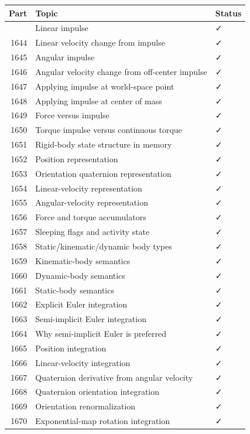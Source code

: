 {\def\LTcaptype{none} %
\begin{longtable}[]{@{}rll@{}}
\toprule\noalign{}
Part & Topic & Status \\
\midrule\noalign{}
\endhead
\bottomrule\noalign{}
\endlastfoot
1643 & Linear impulse & ✓ \\
1644 & Linear velocity change from impulse & ✓ \\
1645 & Angular impulse & ✓ \\
1646 & Angular velocity change from off-center impulse & ✓ \\
1647 & Applying impulse at world-space point & ✓ \\
1648 & Applying impulse at center of mass & ✓ \\
1649 & Force versus impulse & ✓ \\
1650 & Torque impulse versus continuous torque & ✓ \\
1651 & Rigid-body state structure in memory & ✓ \\
1652 & Position representation & ✓ \\
1653 & Orientation quaternion representation & ✓ \\
1654 & Linear-velocity representation & ✓ \\
1655 & Angular-velocity representation & ✓ \\
1656 & Force and torque accumulators & ✓ \\
1657 & Sleeping flags and activity state & ✓ \\
1658 & Static/kinematic/dynamic body types & ✓ \\
1659 & Kinematic-body semantics & ✓ \\
1660 & Dynamic-body semantics & ✓ \\
1661 & Static-body semantics & ✓ \\
1662 & Explicit Euler integration & ✓ \\
1663 & Semi-implicit Euler integration & ✓ \\
1664 & Why semi-implicit Euler is preferred & ✓ \\
1665 & Position integration & ✓ \\
1666 & Linear-velocity integration & ✓ \\
1667 & Quaternion derivative from angular velocity & ✓ \\
1668 & Quaternion orientation integration & ✓ \\
1669 & Orientation renormalization & ✓ \\
1670 & Exponential-map rotation integration & ✓ \\

\end{longtable}}
